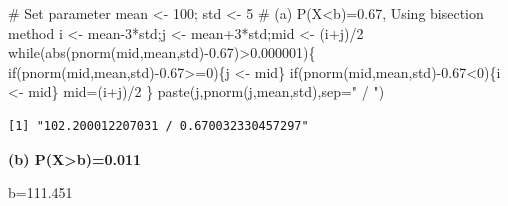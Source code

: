 \documentclass[
  letterpaper,
  DIV=11,
  numbers=noendperiod]{scrreprt}
\newenvironment{Shaded}{\begin{snugshade}}{\end{snugshade}}
\newcommand{\AttributeTok}[1]{\textcolor[rgb]{0.40,0.45,0.13}{#1}}
\newcommand{\CommentTok}[1]{\textcolor[rgb]{0.37,0.37,0.37}{#1}}
\newcommand{\ControlFlowTok}[1]{\textcolor[rgb]{0.00,0.23,0.31}{#1}}
\newcommand{\DecValTok}[1]{\textcolor[rgb]{0.68,0.00,0.00}{#1}}
\newcommand{\FloatTok}[1]{\textcolor[rgb]{0.68,0.00,0.00}{#1}}
\newcommand{\FunctionTok}[1]{\textcolor[rgb]{0.28,0.35,0.67}{#1}}
\newcommand{\NormalTok}[1]{\textcolor[rgb]{0.00,0.23,0.31}{#1}}
\newcommand{\OtherTok}[1]{\textcolor[rgb]{0.00,0.23,0.31}{#1}}
\newcommand{\SpecialCharTok}[1]{\textcolor[rgb]{0.37,0.37,0.37}{#1}}
\newcommand{\StringTok}[1]{\textcolor[rgb]{0.13,0.47,0.30}{#1}}
\begin{document}
\begin{Shaded}
\begin{Highlighting}[]
\CommentTok{\# Set parameter}
\NormalTok{mean }\OtherTok{\textless{}{-}} \DecValTok{100}\NormalTok{; std }\OtherTok{\textless{}{-}} \DecValTok{5}
\CommentTok{\# (a) P(X\textless{}b)=0.67, Using bisection method}
\NormalTok{i }\OtherTok{\textless{}{-}}\NormalTok{ mean}\DecValTok{{-}3}\SpecialCharTok{*}\NormalTok{std;j }\OtherTok{\textless{}{-}}\NormalTok{ mean}\SpecialCharTok{+}\DecValTok{3}\SpecialCharTok{*}\NormalTok{std;mid }\OtherTok{\textless{}{-}}\NormalTok{ (i}\SpecialCharTok{+}\NormalTok{j)}\SpecialCharTok{/}\DecValTok{2}
\ControlFlowTok{while}\NormalTok{(}\FunctionTok{abs}\NormalTok{(}\FunctionTok{pnorm}\NormalTok{(mid,mean,std)}\SpecialCharTok{{-}}\FloatTok{0.67}\NormalTok{)}\SpecialCharTok{\textgreater{}}\FloatTok{0.000001}\NormalTok{)\{}
  \ControlFlowTok{if}\NormalTok{(}\FunctionTok{pnorm}\NormalTok{(mid,mean,std)}\SpecialCharTok{{-}}\FloatTok{0.67}\SpecialCharTok{\textgreater{}=}\DecValTok{0}\NormalTok{)\{j }\OtherTok{\textless{}{-}}\NormalTok{ mid\}}
  \ControlFlowTok{if}\NormalTok{(}\FunctionTok{pnorm}\NormalTok{(mid,mean,std)}\SpecialCharTok{{-}}\FloatTok{0.67}\SpecialCharTok{\textless{}}\DecValTok{0}\NormalTok{)\{i }\OtherTok{\textless{}{-}}\NormalTok{ mid\}}
\NormalTok{  mid}\OtherTok{=}\NormalTok{(i}\SpecialCharTok{+}\NormalTok{j)}\SpecialCharTok{/}\DecValTok{2}
\NormalTok{\}}
\FunctionTok{paste}\NormalTok{(j,}\FunctionTok{pnorm}\NormalTok{(j,mean,std),}\AttributeTok{sep=}\StringTok{" / "}\NormalTok{)}
\end{Highlighting}
\end{Shaded}

\begin{verbatim}
[1] "102.200012207031 / 0.670032330457297"
\end{verbatim}

\textbf{(b) P(X\textgreater b)=0.011}

b=111.451
\end{document}
